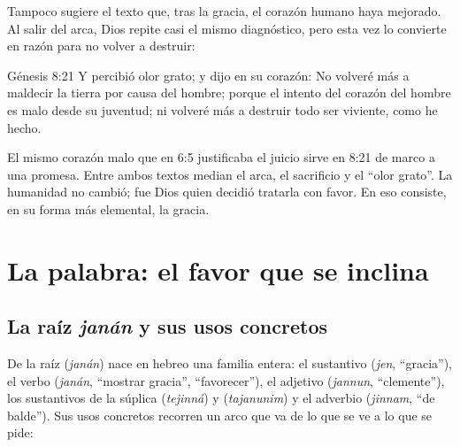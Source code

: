 
Tampoco sugiere el texto que, tras la gracia, el corazón humano haya mejorado. Al salir del arca, Dios repite casi el mismo diagnóstico, pero esta vez lo convierte en razón para no volver a destruir:

\begin{verso}{Génesis 8:21}
Y percibió \SENOR{} olor grato; y dijo \SENOR{} en su corazón: No volveré más a maldecir la tierra por causa del hombre; porque el intento del corazón del hombre es malo desde su juventud; ni volveré más a destruir todo ser viviente, como he hecho.
\end{verso}

El mismo corazón malo que en 6:5 justificaba el juicio sirve en 8:21 de marco a una promesa. Entre ambos textos median el arca, el sacrificio y el ``olor grato''. La humanidad no cambió; fue Dios quien decidió tratarla con favor. En eso consiste, en su forma más elemental, la gracia.

\section{La palabra: el favor que se inclina}

\subsection{La raíz \emph{janán} y sus usos concretos}
De la raíz  (\emph{janán}) nace en hebreo una familia entera: el sustantivo  (\emph{jen}, ``gracia''), el verbo  (\emph{janán}, ``mostrar gracia'', ``favorecer''), el adjetivo  (\emph{jannun}, ``clemente''), los sustantivos de la súplica  (\emph{tejinná}) y  (\emph{tajanunim}) y el adverbio  (\emph{jinnam}, ``de balde''). Sus usos concretos recorren un arco que va de lo que se ve a lo que se pide:

